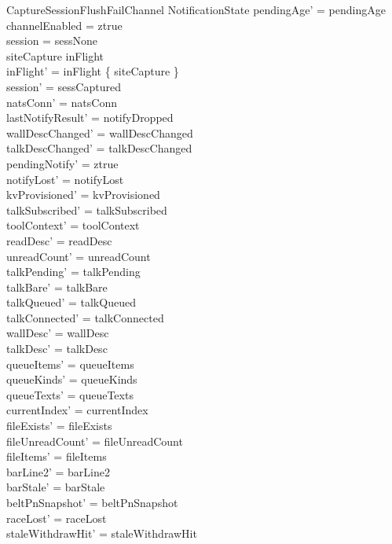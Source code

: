 \documentclass[a4paper,10pt,fleqn]{article}
\begin{document}
\begin{schema}{CaptureSessionFlushFailChannel}
  \Delta NotificationState
  \where
  pendingAge' = pendingAge \\
  channelEnabled = ztrue \\
  session = sessNone \\
  siteCapture \in inFlight \\
  inFlight' = inFlight \setminus \{ siteCapture \} \\
  session' = sessCaptured \\
  natsConn' = natsConn \\
  lastNotifyResult' = notifyDropped \\
  wallDescChanged' = wallDescChanged \\
  talkDescChanged' = talkDescChanged \\
  pendingNotify' = ztrue \\
  notifyLost' = notifyLost \\
  kvProvisioned' = kvProvisioned \\
  talkSubscribed' = talkSubscribed \\
  toolContext' = toolContext \\
  readDesc' = readDesc \\
  unreadCount' = unreadCount \\
  talkPending' = talkPending \\
  talkBare' = talkBare \\
  talkQueued' = talkQueued \\
  talkConnected' = talkConnected \\
  wallDesc' = wallDesc \\
  talkDesc' = talkDesc \\
  queueItems' = queueItems \\
  queueKinds' = queueKinds \\
  queueTexts' = queueTexts \\
  currentIndex' = currentIndex \\
  fileExists' = fileExists \\
  fileUnreadCount' = fileUnreadCount \\
  fileItems' = fileItems \\
  barLine2' = barLine2 \\
  barStale' = barStale \\
  beltPnSnapshot' = beltPnSnapshot \\
  raceLost' = raceLost \\
  staleWithdrawHit' = staleWithdrawHit \\

\end{schema}
\end{document}
